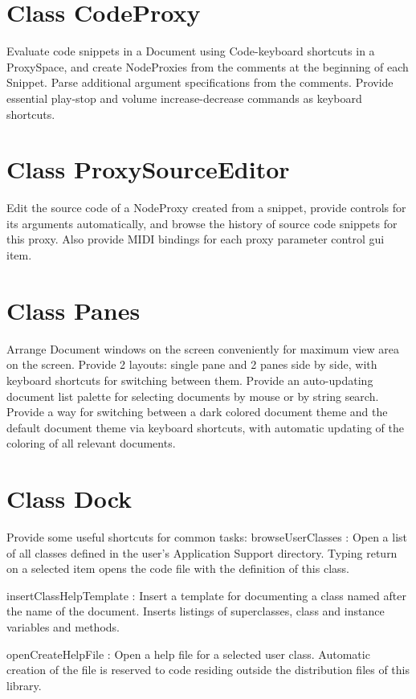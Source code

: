 \documentclass[11pt, a4paper]{scrartcl}
\begin{document}
\section*{Class CodeProxy}
\label{sec-9}


Evaluate code snippets in a Document using Code-keyboard shortcuts in a ProxySpace, and create NodeProxies from the comments at the beginning of each Snippet. Parse additional argument specifications from the comments.  Provide essential play-stop and volume increase-decrease commands as keyboard shortcuts. 
\section*{Class ProxySourceEditor}
\label{sec-10}


Edit the source code of a NodeProxy created from a snippet, provide controls for its arguments automatically, and browse the history of source code snippets for this proxy.  Also provide MIDI bindings for each proxy parameter control gui item. 
\section*{Class Panes}
\label{sec-11}


Arrange Document windows on the screen conveniently for maximum view area on the screen. Provide 2 layouts: single pane and 2 panes side by side, with keyboard shortcuts for switching between them. Provide an auto-updating document list palette for selecting documents by mouse or by string search. Provide a way for switching between a dark colored document theme and the default document theme via keyboard shortcuts, with automatic updating of the coloring of all relevant documents. 
\section*{Class Dock}
\label{sec-12}


Provide some useful shortcuts for common tasks: 
   browseUserClasses :    Open a list of all classes defined in the user's Application Support 
      directory. Typing return on a selected item opens the code file with the definition of this class. 

   insertClassHelpTemplate : Insert a template for documenting a class named after the name of the
      document. Inserts listings of superclasses, class and instance variables and methods. 

   openCreateHelpFile : Open a help file for a selected user class. Automatic creation of the file 
         is reserved to code residing outside the distribution files of this library. 
\end{document}
